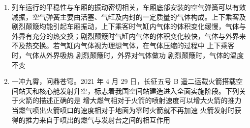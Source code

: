 \documentclass[\gkver]{gaokaozhenti}
\begin{document}
\begin{enumerate}
{C．天问一号探测器从轨道 Ⅰ 进入 Ⅱ，做近心运动，需要的向心力要小于提供的向心力，故要在 P 点点火减速，故 C 错误；

D．在轨道 Ⅰ 向 P 飞近时，万有引力做正功，动能增大，故速度增大，故 D 正确。

故选 D。
}

\item
列车运行的平稳性与车厢的振动密切相关，车厢底部安装的空气弹簧可以有效减振，空气弹簧主要由活塞、气缸及内封的一定质量的气体构成。上下乘客及剧烈颠簸均能引起车厢振动，上下乘客时气缸内气体的体积变化缓慢，气体与外界有充分的热交换；剧烈颠簸时气缸内气体的体积变化较快，气体与外界来不及热交换。若气缸内气体视为理想气体，在气体压缩的过程中 
{上下乘客时，气体从外界吸热}
{剧烈颠簸时，外界对气体做功}
{剧烈颠簸时，气体的温度不变}


\item
一冲九霄，问鼎苍穹。2021 年 4 月 29 日，长征五号 B 遥二运载火箭搭载空间站天和核心舱发射升空，标志着我国空间站建造进入全面实施阶段。下列关于火箭的描述正确的是 
{增大燃气相对于火箭的喷射速度可以增大火箭的推力}
{当燃气喷出火箭喷口的速度相对于地面为零时火箭就不再加速}
{火箭发射时获得的推力来自于喷出的燃气与发射台之间的相互作用}

\end{enumerate}
\end{document}
